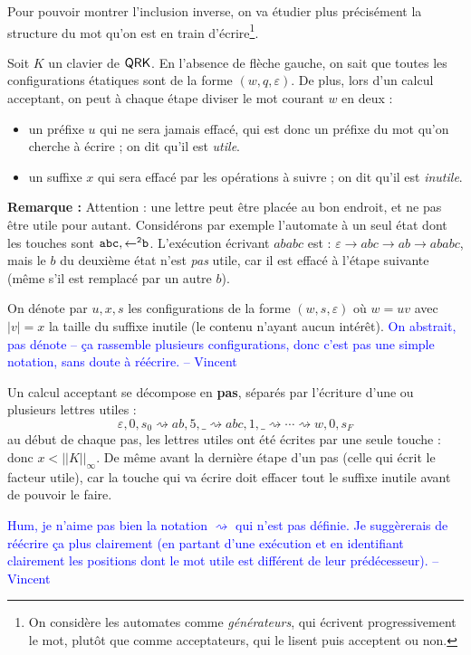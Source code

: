 \documentclass[12pt, a4paper]{article}
\newcommand{\Kinf}{||K||_{\infty}}
\newcommand{\vincent}[1]{\textcolor{blue}{#1 -- Vincent}}
\begin{document}
    Pour pouvoir montrer l'inclusion inverse, on va étudier plus précisément la structure du mot qu'on est en train d'écrire\footnote{On considère les automates comme \emph{générateurs}, qui écrivent progressivement le mot, plutôt que comme acceptateurs, qui le lisent puis acceptent ou non.}.
    
    Soit $K$ un clavier de $\mathsf{QRK}$. En l'absence de flèche gauche, on sait que toutes les configurations étatiques sont de la forme $(w,q,\varepsilon)$. De plus, lors d'un calcul acceptant, on peut à chaque étape diviser le mot courant $w$ en deux :
    \begin{itemize}
        \item un préfixe $u$ qui ne sera jamais effacé, qui est donc un préfixe du mot qu'on cherche à écrire ; on dit qu'il est \emph{utile}.
        \item un suffixe $x$ qui sera effacé par les opérations à suivre ; on dit qu'il est \emph{inutile}.
    \end{itemize}
    \textbf{Remarque :} Attention : une lettre peut être placée au bon endroit, et ne pas être utile pour autant. Considérons par exemple l'automate à un seul état dont les touches sont $\mathtt{abc},\mathtt{\mathord{\leftarrow}^2b}$. 
    L'exécution écrivant $ababc$ est : $\varepsilon \rightarrow abc \rightarrow ab \rightarrow ababc$, mais le $b$ du deuxième état n'est \emph{pas} utile, car il est effacé à l'étape suivante (même s'il est remplacé par un autre $b$). \smallskip

    On dénote par $u,x,s$ les configurations de la forme $(w,s,\varepsilon)$ où $w = uv$ avec $|v| = x$ la taille du suffixe inutile (le contenu n'ayant aucun intérêt). \vincent{On abstrait, pas dénote -- ça rassemble plusieurs configurations, donc c’est pas une simple notation, sans doute à réécrire.}
    \begin{pas}
        Un calcul acceptant se décompose en \textbf{pas}, séparés par l'écriture d'une ou plusieurs lettres utiles :
        \[ \varepsilon,0,s_0 \rightsquigarrow ab,5,\_ \rightsquigarrow abc,1,\_ \rightsquigarrow \cdots \rightsquigarrow w,0,s_F \]
        au début de chaque pas, les lettres utiles ont été écrites par une seule touche : donc $x < \Kinf$. De même avant la dernière étape d'un pas (celle qui écrit le facteur utile), car la touche qui va écrire doit effacer tout le suffixe inutile avant de pouvoir le faire.
    \end{pas}

    \vincent{Hum, je n’aime pas bien la notation $\rightsquigarrow$ qui n’est pas définie. Je suggèrerais de réécrire ça plus clairement (en partant d’une exécution et en identifiant clairement les positions dont le mot utile est différent de leur prédécesseur).}
\end{document}
